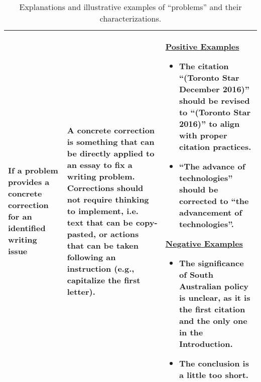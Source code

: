 \begin{table*}[]
\begin{tabular}{p{2.75cm}p{4cm}p{7.5cm}}
      If a problem provides a concrete correction for an identified writing issue & A concrete correction is something that can be directly applied to an essay to fix a writing problem. Corrections should not require thinking to implement, i.e. text that can be copy-pasted, or actions that can be taken following an instruction (e.g., capitalize the first letter). & \underline{Positive Examples}
      \begin{itemize}
          \itemsep-0.25em
          \item The citation ``(Toronto Star December 2016)'' should be revised to ``(Toronto Star 2016)'' to align with proper citation practices.	
          \item ``The advance of technologies'' should be corrected to ``the advancement of technologies''.		
      \end{itemize} \underline{Negative Examples} \begin{itemize}
          \itemsep-0.25em
          \item The significance of South Australian policy is unclear, as it is the first citation and the only one in the Introduction.	
          \item The conclusion is a little too short.	
      \end{itemize}  \\
      
      \bottomrule   
    \end{tabular}
    \caption{Explanations and illustrative examples of ``problems'' and their characterizations.}
    \label{tab:problemCharacterizations}
\end{table*}
